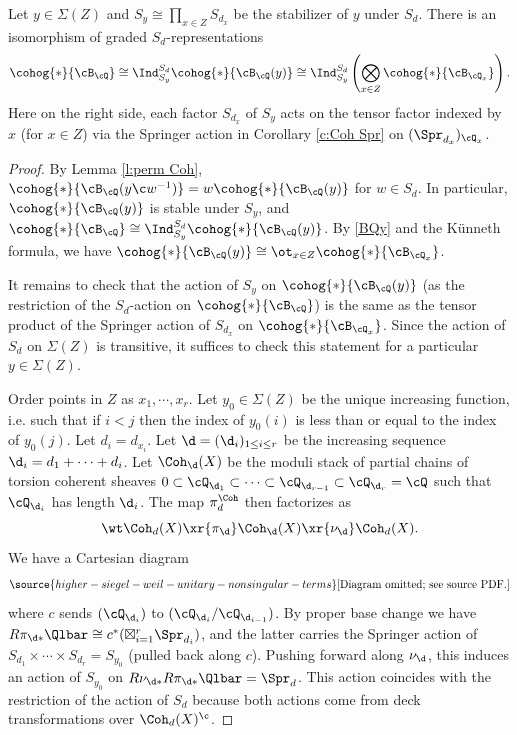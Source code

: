 \begin{cor}
\notready\label{c:Sind} Let $y\in \Sigma(Z)$ and $S_{y}\cong \prod_{x\in Z}S_{d_{x}}$ be the stabilizer of $y$ under $S_{d}$.  There is an isomorphism of graded $S_{d}$-representations
\begin{equation*}
\cohog{*}{\cB_{\cQ}}\cong \Ind^{S_{d}}_{S_{y}}\cohog{*}{\cB_{\cQ}(y)}\cong \Ind^{S_{d}}_{S_{y}}\left(\bigotimes_{x\in Z}\cohog{*}{\cB_{\cQ_{x}}}\right).
\end{equation*}
Here on the right side, each factor $S_{d_{x}}$ of $S_{y}$ acts on the tensor factor indexed by $x$ (for $x\in Z$) via the Springer action in Corollary \ref{c:Coh Spr} on $(\Spr_{d_{x}})_{\cQ_{x}}$.
\end{cor}
\begin{proof} By Lemma \ref{l:perm Coh},  $\cohog{*}{\cB_{\cQ}(y\c w^{-1})}=w\cohog{*}{\cB_{\cQ}(y)}$ for $w\in S_{d}$. In particular, $\cohog{*}{\cB_{\cQ}(y)}$ is stable under $S_{y}$, and  $\cohog{*}{\cB_{\cQ}}\cong \Ind^{S_{d}}_{S_{y}}\cohog{*}{\cB_{\cQ}(y)}$. By \eqref{BQy} and the K\"unneth formula, we have $\cohog{*}{\cB_{\cQ}(y)}\cong \ot_{x\in Z}\cohog{*}{\cB_{\cQ_{x}}}$.

It remains to check that the action of $S_{y}$ on $\cohog{*}{\cB_{\cQ}(y)}$ (as the restriction of the $S_{d}$-action on $\cohog{*}{\cB_{\cQ}}$) is the same as the tensor product of the Springer action of $S_{d_{x}}$ on  $\cohog{*}{\cB_{\cQ_{x}}}$. Since the action of $S_{d}$ on $\Sigma(Z)$ is transitive, it suffices to check this statement for a particular $y\in \Sigma(Z)$.

Order points in $Z$ as $x_{1},\cdots, x_{r}$.  Let $y_{0}\in \Sigma(Z)$ be the unique increasing function, i.e. such that if $i< j$ then the index of $y_0(i)$ is less than or equal to the index of $y_0(j)$. Let $d_{i}=d_{x_{i}}$. Let $\d=(\d_{i})_{1\le i\le r}$ be the increasing sequence $\d_{i}=d_{1}+\cdots+d_{i}$. Let $\Coh_{\d}(X)$ be the moduli stack of partial chains of torsion coherent sheaves $0\subset \cQ_{\d_{1}}\subset \cdots\subset \cQ_{\d_{r-1}}\subset \cQ_{\d_{r}}=\cQ$ such that $\cQ_{\d_{i}}$ has length $\d_{i}$. The map $\pi^{\Coh}_{d}$ then factorizes as
\begin{equation*}
\wt\Coh_{d}(X)\xr{\pi_{\d}}\Coh_{\d}(X)\xr{\nu_{\d}}\Coh_{d}(X).
\end{equation*}
We have a Cartesian diagram
\begin{equation}\label{partial Spr Coh}
\source{higher-siegel-weil-unitary-nonsingular-terms}
\text{[Diagram omitted; see source PDF.]}
\end{equation}
where $c$ sends $(\cQ_{\d_{i}})$ to $(\cQ_{\d_{i}}/\cQ_{\d_{i-1}})$. By proper base change we have $R\pi_{\d*}\Qlbar\cong c^{*}(\boxtimes_{i=1}^{r}\Spr_{d_{i}})$, and the latter carries the Springer action of $S_{d_{1}}\times\cdots\times S_{d_{r}}=S_{y_{0}}$ (pulled back along $c$). Pushing forward along $\nu_{\d}$, this induces an action of $S_{y_{0}}$ on $R\nu_{\d*}R\pi_{\d*}\Qlbar=\Spr_{d}$. This action coincides with the restriction of the action of $S_{d}$ because both actions come from deck transformations over $\Coh_{d}(X)^{\c}$.


\end{proof}
